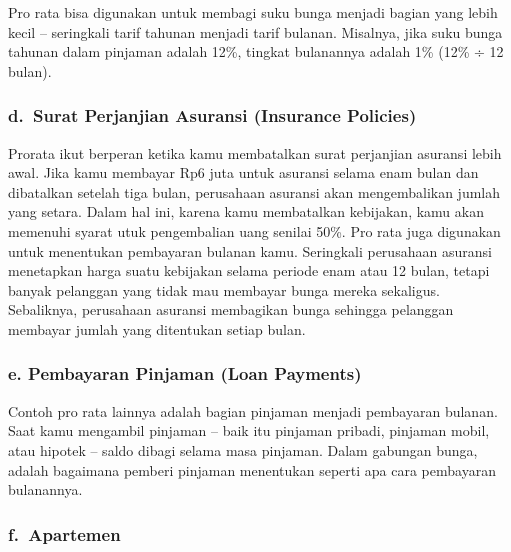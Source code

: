 \documentclass[
]{book}
\begin{document}
Pro rata bisa digunakan untuk membagi suku bunga menjadi bagian yang lebih kecil -- seringkali tarif tahunan menjadi tarif bulanan. Misalnya, jika suku bunga tahunan dalam pinjaman adalah 12\%, tingkat bulanannya adalah 1\% (12\% ÷ 12 bulan).

\hypertarget{d.-surat-perjanjian-asuransi-insurance-policies}{%
\subsubsection*{d.~Surat Perjanjian Asuransi (Insurance Policies)}\label{d.-surat-perjanjian-asuransi-insurance-policies}}

Prorata ikut berperan ketika kamu membatalkan surat perjanjian asuransi lebih awal. Jika kamu membayar Rp6 juta untuk asuransi selama enam bulan dan dibatalkan setelah tiga bulan, perusahaan asuransi akan mengembalikan jumlah yang setara. Dalam hal ini, karena kamu membatalkan kebijakan, kamu akan memenuhi syarat utuk pengembalian uang senilai 50\%. Pro rata juga digunakan untuk menentukan pembayaran bulanan kamu. Seringkali perusahaan asuransi menetapkan harga suatu kebijakan selama periode enam atau 12 bulan, tetapi banyak pelanggan yang tidak mau membayar bunga mereka sekaligus. Sebaliknya, perusahaan asuransi membagikan bunga sehingga pelanggan membayar jumlah yang ditentukan setiap bulan.

\hypertarget{e.-pembayaran-pinjaman-loan-payments}{%
\subsubsection*{e. Pembayaran Pinjaman (Loan Payments)}\label{e.-pembayaran-pinjaman-loan-payments}}

Contoh pro rata lainnya adalah bagian pinjaman menjadi pembayaran bulanan. Saat kamu mengambil pinjaman -- baik itu pinjaman pribadi, pinjaman mobil, atau hipotek -- saldo dibagi selama masa pinjaman. Dalam gabungan bunga, adalah bagaimana pemberi pinjaman menentukan seperti apa cara pembayaran bulanannya.

\hypertarget{f.-apartemen}{%
\subsubsection*{f.~Apartemen}\label{f.-apartemen}}
\end{document}
